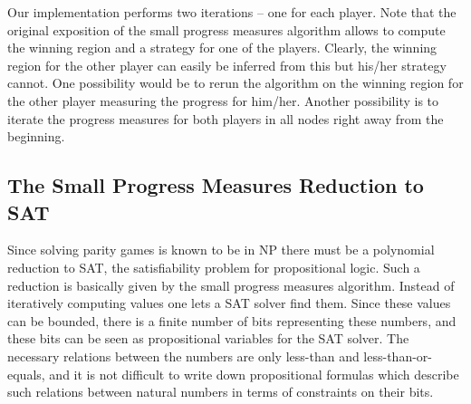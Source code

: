 Our implementation performs two iterations -- one for each player. Note that the original
exposition of the small progress measures algorithm allows to compute the winning region and a strategy
for one of the players. Clearly, the winning region for the other player can easily be inferred from this
but his/her strategy cannot. One possibility would be to rerun the algorithm on the winning region for the
other player measuring the progress for him/her. Another possibility is to iterate the
progress measures for both players in all nodes right away from the beginning.


\subsection{The Small Progress Measures Reduction to SAT}

Since solving parity games is known to be in NP there must be a polynomial reduction to SAT, the
satisfiability problem for propositional logic. Such a reduction is basically given by the small
progress measures algorithm. Instead of iteratively computing values one lets a SAT solver find
them. Since these values can be bounded, there is a finite number of bits representing these numbers,
and these bits can be seen as propositional variables for the SAT solver. The necessary relations
between the numbers are only less-than and less-than-or-equals, and it is not difficult to write down
propositional formulas which describe such relations between natural numbers in terms of constraints
on their bits.


